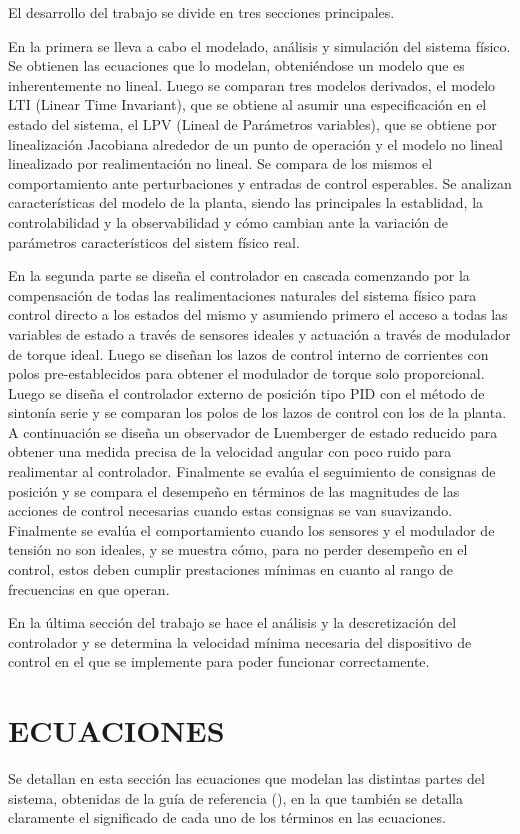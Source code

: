 \documentclass[a4paper, 10pt, onecolumn,journal]{ieeeconf}
\begin{document}
El desarrollo del trabajo se divide en tres secciones principales.

En la primera se lleva a cabo el modelado, análisis y simulación del sistema físico.
Se obtienen las ecuaciones que lo modelan, obteniéndose un modelo que es inherentemente no lineal. Luego se comparan tres modelos derivados, el modelo LTI (Linear Time Invariant), que
se obtiene al asumir una especificación en el estado del sistema, el LPV (Lineal de Parámetros variables), que se obtiene por linealización Jacobiana alrededor de un punto de operación y 
el modelo no lineal linealizado por realimentación no lineal. Se compara de los mismos el comportamiento ante perturbaciones y entradas de control esperables. Se analizan características del modelo de la planta, siendo las principales
la establidad, la controlabilidad y la observabilidad y cómo cambian ante la variación de parámetros característicos del sistem físico real.

En la segunda parte se diseña el controlador en cascada comenzando por la compensación de todas las realimentaciones 
naturales del sistema físico para control directo a los estados del mismo y asumiendo primero el acceso a todas las variables de estado a través de sensores ideales y actuación a través de modulador de torque ideal. Luego se diseñan
los lazos de control interno de corrientes con polos pre-establecidos para obtener el modulador de torque solo proporcional. Luego se diseña el controlador externo de posición tipo PID
con el método de sintonía serie y se comparan los polos de los lazos de control con los de la planta. A continuación se diseña un observador de Luemberger de estado reducido para obtener una medida precisa de la velocidad angular con poco ruido para realimentar al controlador.
Finalmente se evalúa el seguimiento de consignas de posición y se compara el desempeño en términos de las magnitudes de las acciones de control necesarias cuando estas consignas se van suavizando. Finalmente se 
evalúa el comportamiento cuando los sensores y el modulador de tensión no son ideales, y se muestra cómo, para no perder desempeño en el control, estos deben cumplir prestaciones mínimas en cuanto al rango de frecuencias en que operan.

En la última sección del trabajo se hace el análisis y la descretización del controlador y se determina la velocidad mínima necesaria del dispositivo de control en el que se implemente para poder funcionar correctamente.

\newpage
\section{ECUACIONES}
Se detallan en esta sección las ecuaciones que modelan las distintas partes del sistema, obtenidas de la guía de referencia (\cite{c1}), en la que también se detalla claramente el significado de cada uno de los términos en las ecuaciones.
\end{document}
